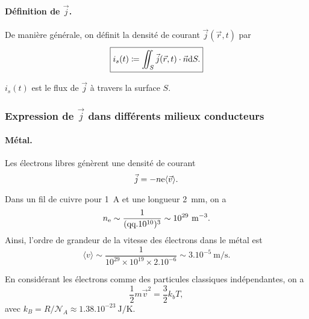             \paragraph{Définition de $\vec{j}$.}

                De manière générale, on définit la densité de courant $\vec{j}(\vec{r},t)$ par 
                \begin{equation}
                    \boxed{
                        i_s(t)\coloneqq\iint_{S}\vec{j}(\vec{r},t)\cdot\vec{n}\mathrm{d} S.
                    }
                \end{equation}

                $i_s(t)$ est le flux de $\vec{j}$ à travers la surface $S$.

        \subsubsection{Expression de $\vec{j}$ dans différents milieux conducteurs}

            \paragraph{Métal.} 
            
                Les électrons libres génèrent une densité de courant 
                \begin{equation}
                    \vec{j}=-n\mathrm{e} \langle \vec{v}\rangle.
                \end{equation}

                Dans un fil de cuivre pour 1~\si{\ampere} et une longueur 2~\si{\milli\metre}, on a 
                \begin{equation}
                    n_{\mathrm{e}}\sim\frac{1}{(\text{qq}.10^{10})^{3}}\sim 10^{29}~\si{\per\metre\cubed}.
                \end{equation}
                Ainsi, l'ordre de grandeur de la vitesse des électrons dans le métal est 
                \begin{equation}
                    \langle v\rangle \sim \frac{1}{10^{29}\times10^{19}\times 2.10^{-6}}\sim3.10^{-5}~\si{\metre\per\second}.
                \end{equation}

                En considérant les électrons comme des particules classiques indépendantes, on a 
                \begin{equation}
                    \frac{1}{2}m\vec{v}^{2}=\frac{3}{2}k_b T,
                \end{equation}
                avec $k_B=R/\mathcal{N}_A\approx 1.38.10^{-23}~\si{\joule\per\kelvin}$.

